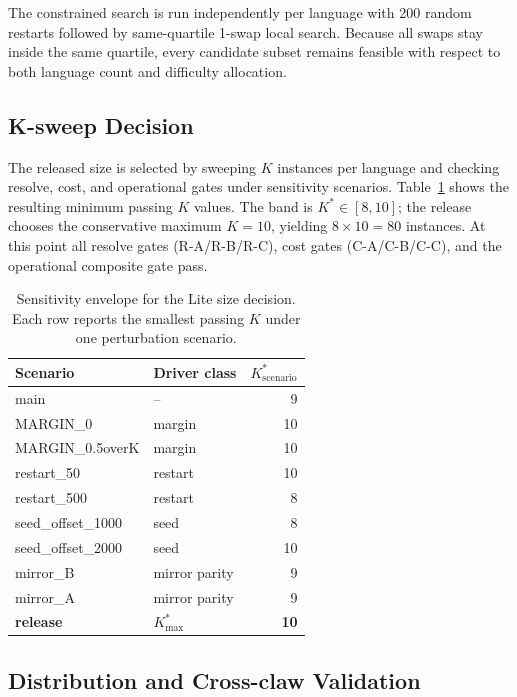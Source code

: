 The constrained search is run independently per language with 200
random restarts followed by same-quartile 1-swap local search.  Because
all swaps stay inside the same quartile, every candidate subset remains
feasible with respect to both language count and difficulty allocation.

\subsection{K-sweep Decision}

The released size is selected by sweeping $K$ instances per language and
checking resolve, cost, and operational gates under sensitivity
scenarios.  Table~\ref{tab:lite-k-sweep} shows the resulting minimum
passing $K$ values.  The band is $K^*\in[8,10]$; the release chooses the
conservative maximum $K=10$, yielding $8\times10=80$ instances.  At
this point all resolve gates (R-A/R-B/R-C), cost gates (C-A/C-B/C-C),
and the operational composite gate pass.

\begin{table}[h]
\centering
\small
\caption{Sensitivity envelope for the Lite size decision.  Each row
reports the smallest passing $K$ under one perturbation scenario.}
\label{tab:lite-k-sweep}
\begin{tabular}{llr}
\toprule
Scenario & Driver class & $K^*_{\mathrm{scenario}}$ \\
\midrule
main & -- & 9 \\
MARGIN\_0 & margin & 10 \\
MARGIN\_0.5overK & margin & 10 \\
restart\_50 & restart & 10 \\
restart\_500 & restart & 8 \\
seed\_offset\_1000 & seed & 8 \\
seed\_offset\_2000 & seed & 10 \\
mirror\_B & mirror parity & 9 \\
mirror\_A & mirror parity & 9 \\
\midrule
\textbf{release} & $K^*_{\max}$ & \textbf{10} \\
\bottomrule
\end{tabular}
\end{table}

\subsection{Distribution and Cross-claw Validation}

